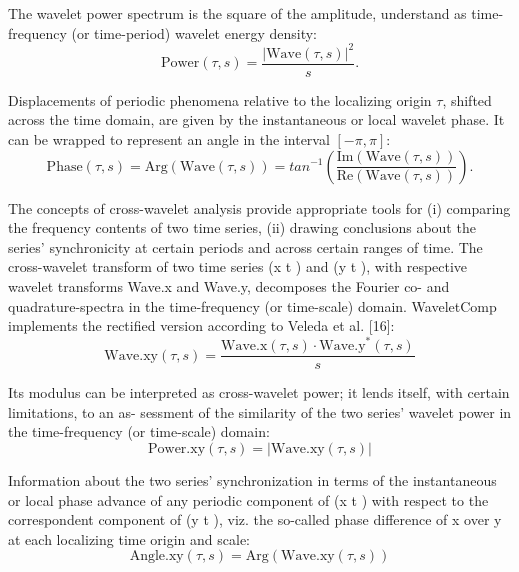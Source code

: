 \documentclass{biophys-new}
\begin{document}
The wavelet power spectrum is the square of the amplitude, understand as time-frequency (or time-period) wavelet energy density:
\begin{equation}\label{eq:power}
\text{Power}(\tau, s)=\frac{|\text{Wave}(\tau, s)|^2}{s}.
\end{equation}

Displacements of periodic phenomena relative to the localizing origin $\tau$, shifted across the time domain, are given by the instantaneous or local wavelet phase.
It can be wrapped to represent an angle in the interval $[-\pi,\pi]$:
\begin{equation}\label{eq:phase}
\text{Phase}(\tau, s)=\text{Arg}(\text{Wave}(\tau, s))=tan^{-1}\left(\frac{\text{Im}(\text{Wave}(\tau, s))}{\text{Re}(\text{Wave}(\tau, s))}\right).
\end{equation}

The concepts of cross-wavelet analysis provide appropriate tools for (i) comparing the frequency contents of two time series, (ii) drawing conclusions about the series’ synchronicity at certain periods and across certain ranges of time.
The cross-wavelet transform of two time series (x t ) and (y t ), with respective wavelet transforms Wave.x and Wave.y, decomposes the Fourier co- and quadrature-spectra in the time-frequency (or time-scale) domain.
WaveletComp implements the rectified version according to Veleda et al. [16]:
\begin{equation}\label{eq:wave.xy}
\text{Wave.xy}(\tau, s)=\frac{\text{Wave.x}(\tau, s)\cdot\text{Wave.y}^{\ast}(\tau, s)}{s}
\end{equation}

Its modulus can be interpreted as cross-wavelet power; it lends itself, with certain limitations, to an as-
sessment of the similarity of the two series’ wavelet power in the time-frequency (or time-scale) domain:
\begin{equation}\label{eq:power.xy}
\text{Power.xy}(\tau, s)=|\text{Wave.xy}(\tau, s)|
\end{equation}

Information about the two series’ synchronization in terms of the instantaneous or local phase advance of any periodic component of (x t ) with respect to the correspondent component of (y t ), viz. the so-called phase difference of x over y at each localizing time origin and scale:
\begin{equation}\label{eq:angle}
\text{Angle.xy}(\tau, s)=\text{Arg}(\text{Wave.xy}(\tau, s))
\end{equation}
\end{document}
